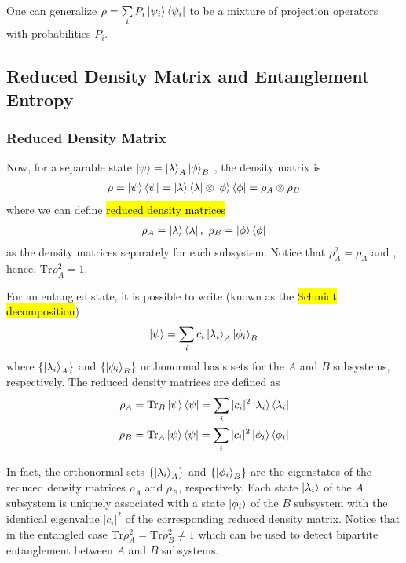 One can generalize $\rho=\sum\limits_i P_i\ket{\psi_i}\bra{\psi_i}$ to be a mixture of projection operators with probabilities $P_i$. 

\subsection{Reduced Density Matrix and Entanglement Entropy}

\subsubsection{Reduced Density Matrix}
Now, for a separable state $\ket{\psi}=\ket{\lambda}_A\ket{\phi}_B$ , the density matrix is
\begin{align*}
    \rho=\ket{\psi}\bra{\psi}=\ket{\lambda}\bra{\lambda}\otimes \ket{\phi}\bra{\phi}=\rho_A \otimes \rho_B
\end{align*}
where we can define \hl{reduced density matrices}
\begin{align*}
    \rho_A=\ket{\lambda}\bra{\lambda},\ \rho_B=\ket{\phi}\bra{\phi}
\end{align*}
as the density matrices separately for each subsystem. Notice that $\rho_A^2=\rho_A$ and , hence, $\mathrm{Tr}\rho_A^2=1$. 

For an entangled state, it is possible to write (known as the \hl{Schmidt decomposition})
\begin{align*}
    \ket{\psi}=\sum_i c_i\ket{\lambda_i}_A\ket{\phi_i}_B
\end{align*}
where $\left\{ \ket{\lambda_i}_A \right\}$ and $\left\{ \ket{\phi_i}_B \right\}$ orthonormal basis sets for the $A$ and $B$ subsystems, respectively. The reduced density matrices are defined as 
\begin{align*}
    \rho_A&=\mathrm{Tr}_B\ket{\psi}\bra{\psi}=\sum_i|c_i|^2\ket{\lambda_i}\bra{\lambda_i}\\
    \rho_B&=\mathrm{Tr}_A\ket{\psi}\bra{\psi}=\sum_i|c_i|^2\ket{\phi_i}\bra{\phi_i}
\end{align*}

In fact, the orthonormal sets $\left\{ \ket{\lambda_i}_A \right\}$ and $\left\{ \ket{\phi_i}_B \right\}$ are the eigenstates of the reduced density matrices $\rho_A$ and $\rho_B$, respectively. Each state $\ket{\lambda_i}$ of the $A$ subsystem is uniquely associated with a state $\ket{\phi_i}$ of the $B$ subsystem with the identical eigenvalue $|c_i|^2$ of the corresponding reduced density matrix. Notice that in the entangled case $\mathrm{Tr}\rho_A^2=\mathrm{Tr}\rho_B^2\ne 1$ which can be used to detect bipartite entanglement between $A$ and $B$ subsystems. 

